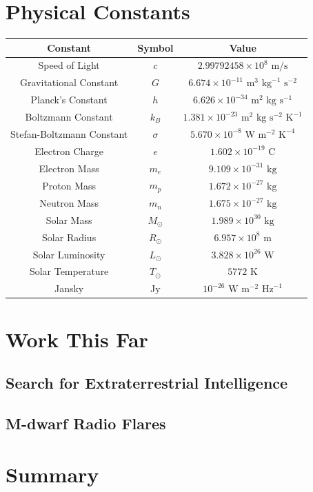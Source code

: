 \documentclass[a4paper,12pt]{article}
\begin{document}
\newpage
\section*{Physical Constants}
\vspace*{\fill}
\begin{table}[H]
        \centering
        \begin{tabular}{|c|c|c|}
                \hline
                Constant & Symbol & Value \\
                \hline
                Speed of Light & $c$ & $2.99792458 \times 10^8 \text{ m/s}$ \\
                Gravitational Constant & $G$ & $6.674 \times 10^{-11} \text{ m}^3 \text{ kg}^{-1} \text{ s}^{-2}$ \\
                Planck's Constant & $h$ & $6.626 \times 10^{-34} \text{ m}^2 \text{ kg} \text{ s}^{-1}$ \\
                Boltzmann Constant & $k_B$ & $1.381 \times 10^{-23} \text{ m}^2 \text{ kg} \text{ s}^{-2} \text{ K}^{-1}$ \\
                Stefan-Boltzmann Constant & $\sigma$ & $5.670 \times 10^{-8} \text{ W} \text{ m}^{-2} \text{ K}^{-4}$ \\
                Electron Charge & $e$ & $1.602 \times 10^{-19} \text{ C}$ \\
                Electron Mass & $m_e$ & $9.109 \times 10^{-31} \text{ kg}$ \\
                Proton Mass & $m_p$ & $1.672 \times 10^{-27} \text{ kg}$ \\
                Neutron Mass & $m_n$ & $1.675 \times 10^{-27} \text{ kg}$ \\
                Solar Mass & $M_\odot$ & $1.989 \times 10^{30} \text{ kg}$ \\
                Solar Radius & $R_\odot$ & $6.957 \times 10^8 \text{ m}$ \\
                Solar Luminosity & $L_\odot$ & $3.828 \times 10^{26} \text{ W}$ \\
                Solar Temperature & $T_\odot$ & $5772 \text{ K}$ \\
                Jansky & Jy & $10^{-26} \text{ W} \text{ m}^{-2} \text{ Hz}^{-1}$ \\
                \hline
        \end{tabular}
\end{table}
\vspace*{\fill}

\newpage


\section{Work This Far}
\subsection{Search for Extraterrestrial Intelligence}
\subsection{M-dwarf Radio Flares}

\section{Summary}

\newpage

\newpage
\printindex
\end{document}
